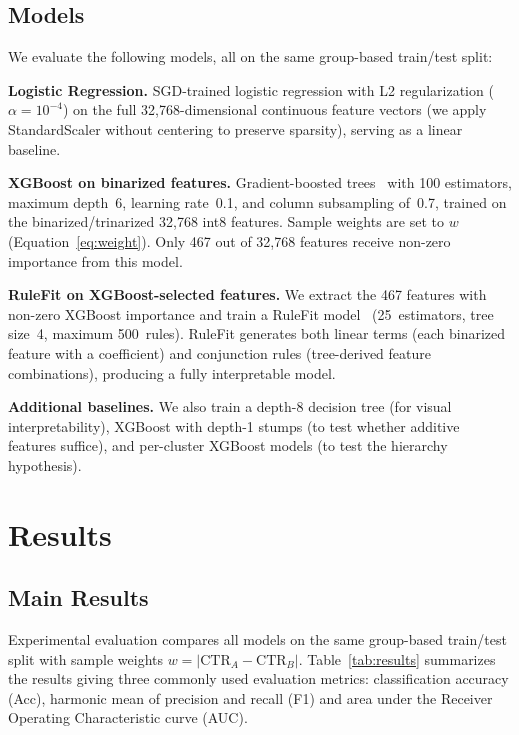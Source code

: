 \documentclass[sigconf,natbib=false, language=english]{acmart}
\begin{document}
\subsection{Models}

We evaluate the following models, all on the same group-based train/test split:

\textbf{Logistic Regression.} SGD-trained logistic regression with L2 regularization ($\alpha = 10^{-4}$) on the full 32,768-dimensional continuous feature vectors (we apply StandardScaler without centering to preserve sparsity), serving as a linear baseline.

\textbf{XGBoost on binarized features.} Gradient-boosted trees~\cite{chen2016xgboost} with 100 estimators, maximum depth~6, learning rate~0.1, and column subsampling of~0.7, trained on the binarized/trinarized 32,768 int8 features. Sample weights are set to $w$ (Equation~\ref{eq:weight}). Only 467 out of 32,768 features receive non-zero importance from this model.

\textbf{RuleFit on XGBoost-selected features.} We extract the 467 features with non-zero XGBoost importance and train a RuleFit model~\cite{friedman2008rulefit} (25~estimators, tree size~4, maximum 500~rules). RuleFit generates both linear terms (each binarized feature with a coefficient) and conjunction rules (tree-derived feature combinations), producing a fully interpretable model.

\textbf{Additional baselines.} We also train a depth-8 decision tree (for visual interpretability), XGBoost with depth-1 stumps (to test whether additive features suffice), and per-cluster XGBoost models (to test the hierarchy hypothesis). %

\section{Results}

\subsection{Main Results}

Experimental evaluation compares all models on the same group-based train/test split
with sample weights $w = |\mathrm{CTR}_A - \mathrm{CTR}_B|$.
Table~\ref{tab:results} summarizes the results giving three commonly used evaluation
metrics: classification accuracy (Acc), harmonic mean of precision and recall (F1) and
area under the Receiver Operating Characteristic curve (AUC).
\end{document}
